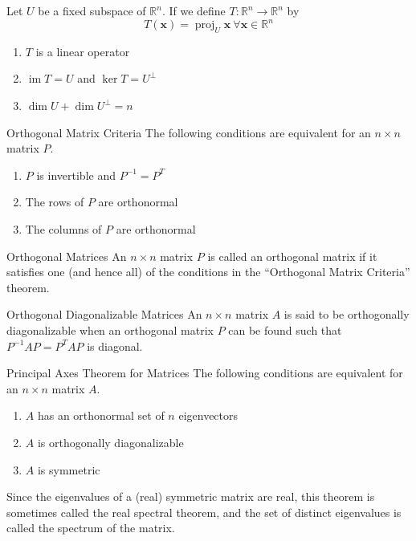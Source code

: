 \documentclass[12pt]{article}
\begin{document}
\begin{theorem}{}{}
    Let $ U $ be a fixed subspace of $ \mathbb{R}^n $. If we define $ T : \mathbb{R}^n \to \mathbb{R}^n $ by
    \[ T \left( \mathbf{x} \right) = \operatorname{proj}_U \mathbf{x} \ \forall \mathbf{x} \in \mathbb{R}^n \]
    \begin{enumerate}[label=(\roman*)]
        \item $ T $ is a linear operator
        \item $ \operatorname{im} T = U $ and $ \ker T = U^\perp $
        \item $ \dim U + \dim U^\perp = n $
    \end{enumerate}
\end{theorem}

\begin{theorem}{Orthogonal Matrix Criteria}{}
    The following conditions are equivalent for an $ n \times n $ matrix $ P $.
    \begin{enumerate}[label=(\roman*)]
        \item $ P $ is invertible and $ P^{-1} = P^T $
        \item The rows of $ P $ are orthonormal
        \item The columns of $ P $ are orthonormal
    \end{enumerate}
\end{theorem}

\begin{definition}{Orthogonal Matrices}{}
    An $ n \times n $ matrix $ P $ is called an orthogonal matrix if it satisfies one (and hence all) of the conditions in the ``Orthogonal Matrix Criteria'' theorem.
\end{definition}

\begin{definition}{Orthogonal Diagonalizable Matrices}{}
    An $ n \times n $ matrix $ A $ is said to be orthogonally diagonalizable when an orthogonal matrix $ P $ can be found such that $ P^{-1} AP = P^T AP $ is diagonal.
\end{definition}

\begin{theorem}{Principal Axes Theorem for Matrices}{}
    The following conditions are equivalent for an $ n \times n $ matrix $ A $.
    \begin{enumerate}[label=(\roman*)]
        \item $ A $ has an orthonormal set of $ n $ eigenvectors
        \item $ A $ is orthogonally diagonalizable
        \item $ A $ is symmetric
    \end{enumerate}
    Since the eigenvalues of a (real) symmetric matrix are real, this theorem is sometimes called the real spectral theorem, and the set of distinct eigenvalues is called the spectrum of the matrix.
\end{theorem}
\end{document}
